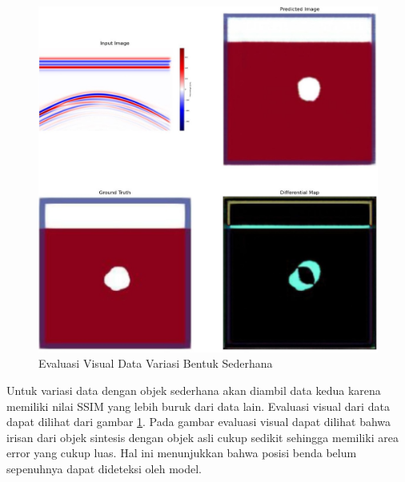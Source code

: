 \begin{figure}[ht]
  \centering
  \includegraphics[scale=0.15]{gambar/diffMapSederhana.jpg}
  \caption{Evaluasi Visual Data Variasi Bentuk Sederhana}
  \label{fig:diffmapsederhana}
\end{figure}

Untuk variasi data dengan objek sederhana akan diambil data kedua karena memiliki nilai SSIM yang lebih buruk dari data lain. 
Evaluasi visual dari data dapat dilihat dari gambar \ref{fig:diffmapsederhana}.
Pada gambar evaluasi visual dapat dilihat bahwa irisan dari objek sintesis dengan objek asli cukup sedikit sehingga memiliki area error yang cukup luas. 
Hal ini menunjukkan bahwa posisi benda belum sepenuhnya dapat dideteksi oleh model.

